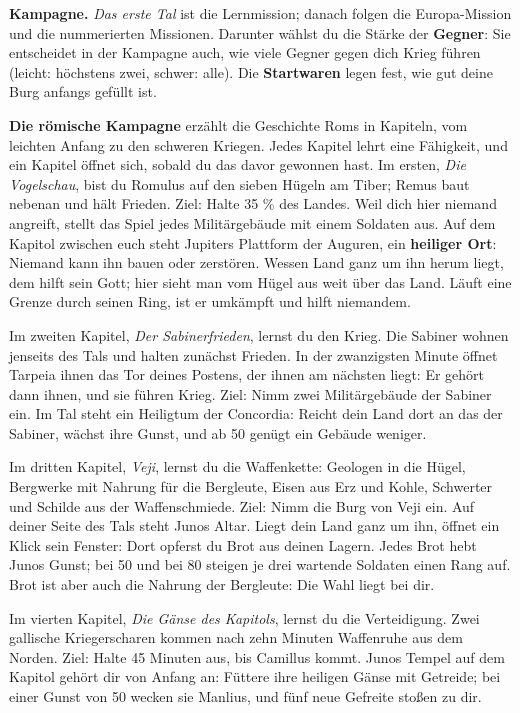 \documentclass[a4paper,11pt,oneside,DIV=12,headings=small,toc=chapterentrydotfill]{scrbook}
\begin{document}

\textbf{Kampagne.} \emph{Das erste Tal} ist die Lernmission; danach folgen die Europa-Mission und die
nummerierten Missionen. Darunter wählst du die Stärke der \textbf{Gegner}: Sie entscheidet in der Kampagne
auch, wie viele Gegner gegen dich Krieg führen (leicht: höchstens zwei, schwer: alle). Die
\textbf{Startwaren} legen fest, wie gut deine Burg anfangs gefüllt ist.

\textbf{Die römische Kampagne} erzählt die Geschichte Roms in Kapiteln, vom leichten Anfang zu den schweren
Kriegen. Jedes Kapitel lehrt eine Fähigkeit, und ein Kapitel öffnet sich, sobald du das davor gewonnen hast.
Im ersten, \emph{Die Vogelschau}, bist du Romulus auf den sieben Hügeln am Tiber; Remus baut nebenan und hält
Frieden. Ziel: Halte 35 \% des Landes. Weil dich hier niemand angreift, stellt das Spiel jedes Militärgebäude
mit einem Soldaten aus. Auf dem Kapitol zwischen euch steht Jupiters Plattform der Auguren, ein
\textbf{heiliger Ort}: Niemand kann ihn bauen oder zerstören. Wessen Land ganz um ihn herum liegt, dem hilft sein
Gott; hier sieht man vom Hügel aus weit über das Land. Läuft eine Grenze durch seinen Ring, ist er umkämpft und
hilft niemandem.

Im zweiten Kapitel, \emph{Der Sabinerfrieden}, lernst du den Krieg. Die Sabiner wohnen jenseits des Tals und
halten zunächst Frieden. In der zwanzigsten Minute öffnet Tarpeia ihnen das Tor deines Postens, der ihnen am
nächsten liegt: Er gehört dann ihnen, und sie führen Krieg. Ziel: Nimm zwei Militärgebäude der Sabiner ein. Im
Tal steht ein Heiligtum der Concordia: Reicht dein Land dort an das der Sabiner, wächst ihre Gunst, und ab 50
genügt ein Gebäude weniger.

Im dritten Kapitel, \emph{Veji}, lernst du die Waffenkette: Geologen in die Hügel, Bergwerke mit Nahrung für
die Bergleute, Eisen aus Erz und Kohle, Schwerter und Schilde aus der Waffenschmiede. Ziel: Nimm die Burg von Veji
ein. Auf deiner Seite des Tals steht Junos Altar. Liegt dein Land ganz um ihn, öffnet ein Klick sein Fenster: Dort
opferst du Brot aus deinen Lagern. Jedes Brot hebt Junos Gunst; bei 50 und bei 80 steigen je drei wartende
Soldaten einen Rang auf. Brot ist aber auch die Nahrung der Bergleute: Die Wahl liegt bei dir.

Im vierten Kapitel, \emph{Die Gänse des Kapitols}, lernst du die Verteidigung. Zwei gallische Kriegerscharen
kommen nach zehn Minuten Waffenruhe aus dem Norden. Ziel: Halte 45 Minuten aus, bis Camillus kommt. Junos Tempel
auf dem Kapitol gehört dir von Anfang an: Füttere ihre heiligen Gänse mit Getreide; bei einer Gunst von 50 wecken
sie Manlius, und fünf neue Gefreite stoßen zu dir.
\end{document}
